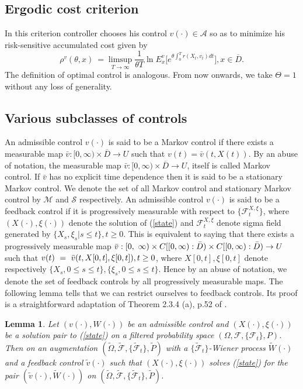 \documentclass[11pt]{amsart}
\newtheorem{lemma}{\bf Lemma}[section]
\numberwithin{equation}{section}
\begin{document}
\subsection{Ergodic cost criterion}
In this criterion controller chooses his control $v (\cdot) \in {\mathcal A}$ so as to minimize his risk-sensitive
accumulated cost given by
\begin{equation}\label{risksensitivecost}
\rho^{v} (\theta, x) \ = \limsup_{T \to \infty} \frac{1}{\theta T} \ln E^{v}_x
\Big[ e^{\theta \int^T_0 r(X_t, v_t) dt} \Big] , x \in \overline{D}.
\end{equation}
The definition of  optimal control is analogous. From now onwards, we take $\Theta = 1$ without any
loss of generality. 

\subsection{ Various subclasses of controls}An admissible control $v(\cdot)$ is said to be  a Markov control if there exists a measurable map $\bar{v}:[0,\infty)\times \overline{D} \longrightarrow U$ such that $v(t)=\bar{v}(t,X(t))$. By an abuse of notation, the measurable map  $\bar{v}:[0,\infty)\times \overline{D} \longrightarrow U$, itself is called Markov control. If $\bar{v}$ has no explicit time dependence then it is said to be a stationary Markov control. We denote the set of all Markov control and stationary Markov control by $\mathcal{M}$ and $\mathcal{S}$ respectively. An admissible control $v(\cdot)$ is said to be 
a feedback control if it is progressively measurable with respect to $\{{\mathcal F}^{X, \xi}_t \}$, where $(X(\cdot), \xi(\cdot)) $ denote the solution of (\ref{state}) and 
${\mathcal F}^{X, \xi}_t $  denote sigma field generated by  $\{X_s, \xi_s |  s \leq t \}, t \geq 0$.
 This is equivalent to saying that there exists a progressively measurable map 
$\Bar{v} : [0, \ \infty) \times C[ [0, \infty) :\Bar{D}) \times C[ [0, \infty) :\Bar{D}) \to U$ 
such that $v(t) \ = \ \Bar{v}(t, X[0, t], \xi [0, t]), t \geq 0$, where $X[0, t], \xi[0, t] $ denote 
respectively  $\{X_s , 0 \leq s \leq t \}, \{\xi_s , 0 \leq s \leq t \}$. 
Hence by an abuse of notation, we denote the set of feedback controls by all progressively measurable
maps. The following lemma tells that we can restrict ourselves to feedback  controls. Its proof is a straightforward adaptation of Theorem 2.3.4 (a), p.52 of \cite{arapostathis_borkar_ghosh}.
\begin{lemma} Let $(v(\cdot), W(\cdot))$ be an admissible control and $(X(\cdot), \xi(\cdot))$ be a 
solution pair to (\ref{state}) on a filtered probability space $(\Omega, \mathcal {F}, \{\mathcal{F}_t\}, P)$. Then on an augmentation $(\tilde{\Omega}, \tilde{\mathcal{F}}, 
\{\tilde{\mathcal{F}}_t\}, \tilde{P})$ with a $\{ \tilde{\mathcal{F}}_t\}$-Wiener process $\tilde{W}(\cdot)$
and a feedback control $\tilde{v}(\cdot)$ such that $(X(\cdot), \xi(\cdot))$ solves (\ref{state})
for the pair $(\tilde{v}(\cdot), \tilde{W}(\cdot))$ on 
$(\tilde{\Omega}, \tilde{\mathcal{F}}, \{\tilde{\mathcal{F}}_t\}, \tilde{P})$.
\end{lemma}
\end{document}
